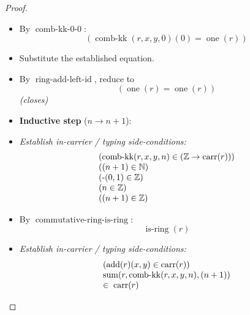 \documentclass[11pt]{article}
\theoremstyle{plain}
\begin{document}
\begin{proof}
\begin{itemize}[leftmargin=2.8em, itemsep=4pt, parsep=1pt]
  \item[\textbf{11}] By $\operatorname{comb\text{-}kk\text{-}0\text{-}0}$:
\begin{equation*}
(\operatorname{comb\text{-}kk}(r, x, y, 0)(0) = \operatorname{one}(r))
\end{equation*}

  \item[\textbf{12}] Substitute the established equation.
  \item[\textbf{13--14}] By $\operatorname{ring\text{-}add\text{-}left\text{-}id}$, reduce to
\begin{equation*}
(\operatorname{one}(r) = \operatorname{one}(r))
\end{equation*}
  \emph{(closes)}
  \item[]\textbf{Inductive step} ($n \to n + 1$):
  \item[\textbf{15--24}] \emph{Establish in-carrier / typing side-conditions:}
\begin{equation*}
\begin{array}{@{}l@{}}
(\operatorname{comb\text{-}kk}(r, x, y, n) \in (\mathbb{Z} \to \operatorname{carr}(r))) \\
((n + 1) \in \mathbb{N}) \\
(\operatorname{\text{-}}(0, 1) \in \mathbb{Z}) \\
(n \in \mathbb{Z}) \\
((n + 1) \in \mathbb{Z})
\end{array}
\end{equation*}

  \item[\textbf{25}] By $\operatorname{commutative\text{-}ring\text{-}is\text{-}ring}$:
\begin{equation*}
\operatorname{is\text{-}ring}(r)
\end{equation*}

  \item[\textbf{26--27}] \emph{Establish in-carrier / typing side-conditions:}
\begin{equation*}
\begin{array}{@{}l@{}}
(\operatorname{add}(r)(x, y) \in \operatorname{carr}(r)) \\
\begin{array}{@{}l@{}} \operatorname{sum}(r, \operatorname{comb\text{-}kk}(r, x, y, n), (n + 1)) \\ \in\; \operatorname{carr}(r) \end{array}
\end{array}
\end{equation*}


\end{itemize}
\end{proof}
\end{document}
